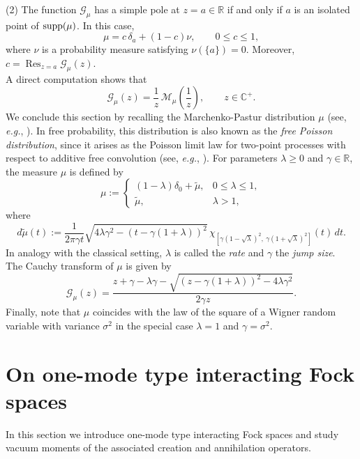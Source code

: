 \documentclass[12pt]{amsart}
\numberwithin{equation}{section}
\theoremstyle{definition}
\def\supp{\mathop{\rm supp}}
\def\supp{\mathop{\rm supp}}
\begin{document}
\medskip
\noindent
(2) The function $\mathcal{G}_{\mu}$ has a simple pole at $z=a\in\mathbb{R}$ if and only if $a$ is an isolated point of $\supp(\mu)$. In this case,
\[
\mu=c\,\delta_a+(1-c)\nu,\qquad 0\le c\le1,
\]
where $\nu$ is a probability measure satisfying $\nu(\{a\})=0$. Moreover, $c=\operatorname*{Res}_{z=a}\mathcal{G}_{\mu}(z)$.\\
A direct computation shows that
\begin{equation}
\label{AA}
\mathcal{G}_{\mu}(z)
=\frac{1}{z}\,
\mathcal{M}_\mu\!\left(\frac{1}{z}\right),
\qquad z\in\mathbb{C}^+.
\end{equation}
We conclude this section by recalling the Marchenko-Pastur distribution $\mu$ (see, \textit{e.g.}, \cite{MP}). In free probability, this distribution is also known as the \emph{free Poisson distribution}, since it arises as the Poisson limit law for two-point processes with respect to additive free convolution (see, \textit{e.g.}, \cite{NS}). For parameters $\lambda\geq 0$ and $\gamma\in\mathbb{R}$, the measure $\mu$ is defined by
\[
\mu :=
\begin{cases}
(1-\lambda)\delta_0+\widetilde{\mu}, & 0\le \lambda\le1,\\
\widetilde{\mu}, & \lambda>1,
\end{cases}
\]
where
\[
d\widetilde{\mu}(t)
:=\frac{1}{2\pi\gamma t}
\sqrt{4\lambda\gamma^2-(t-\gamma(1+\lambda))^2}\,
\chi_{[\gamma(1-\sqrt{\lambda})^2,\ \gamma(1+\sqrt{\lambda})^2]}(t)\,dt.
\]
In analogy with the classical setting, $\lambda$ is called the \emph{rate} and $\gamma$ the \emph{jump size}.\\
The Cauchy transform of $\mu$ is given by
\begin{equation}
\label{CaMP}
\mathcal{G}_{\mu}(z)=
\frac{z+\gamma-\lambda\gamma-\sqrt{(z-\gamma(1+\lambda))^2-4\lambda\gamma^2}}
{2\gamma z}.
\end{equation}
Finally, note that $\mu$ coincides with the law of the square of a Wigner random variable with variance $\sigma^2$ in the special case $\lambda=1$ and $\gamma=\sigma^2$.

\section{On one-mode type interacting Fock spaces}
In this section we introduce one-mode type interacting Fock spaces and study vacuum moments of the associated creation and annihilation operators.\\
\end{document}
